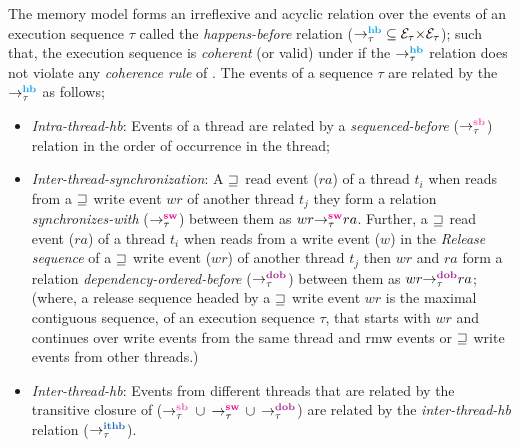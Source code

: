 The \cc memory model forms an irreflexive and acyclic relation over the events of 
an execution sequence $\tau$ called the {\em happens-before} relation 
($\setHB \subseteq \events_\tau {\times} \events_\tau$);
such that, the execution sequence is {\em coherent} (or valid) under \cc if 
the $\setHB$ relation does not violate any {\em coherence rule} of \cc.
%
The events of a sequence $\tau$ are related by the $\setHB$ as follows;
\begin{itemize}
	\item {\em Intra-thread-hb}: Events of a thread are related by a {\em sequenced-before}
	($\setSB$) relation in the order of occurrence in the thread;
	
	\item {\em Inter-thread-synchronization}: A ${\sqsupseteq}$ \acq read event ($ra$) of a thread 
	$t_i$ when reads from a ${\sqsupseteq}$ \rel write event $wr$ of another thread $t_j$ they form a
	relation {\em synchronizes-with} ($\setSW$) between them as $\sw{\tau}{wr}{ra}$.
	Further, a ${\sqsupseteq}$ \acq read event ($ra$) of a thread $t_i$ when reads from a write 
	event ($w$) in the {\em Release sequence} \cite{C11} of a ${\sqsupseteq}$ \rel write event ($wr$) of 
	another thread $t_j$ then $wr$ and $ra$ form a relation {\em dependency-ordered-before}
	($\setDOB$) between them as $\dob{\tau}{wr}{ra}$;
	(where, a release sequence headed by a ${\sqsupseteq}$ \rel write event $wr$ is the maximal 
	contiguous sequence, of an execution sequence $\tau$, that starts with $wr$ and continues 
	over write events from the same thread and rmw events or ${\sqsupseteq}$ \rel write events from
	other threads.)
	
	\item {\em Inter-thread-hb}: Events from different threads that are related by the 
	transitive closure of ($\setSB$ $\cup$ $\setSW$ $\cup$ $\setDOB$) are related by 
	the {\em inter-thread-hb} relation ($\setITHB$). 
\end{itemize}

